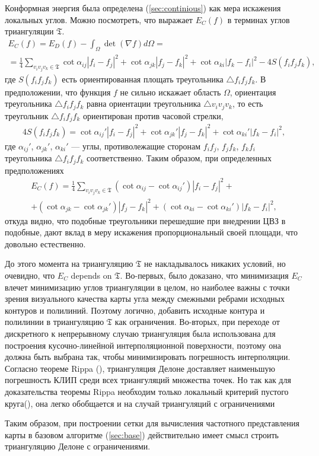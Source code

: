 Конформная энергия была определена (\ref{sec:continious}) как мера искажения локальных углов.
Можно посмотреть, что выражает $E_C(f)$ в терминах углов триангуляции $\mathfrak{T}$. 
\begin{multline*}
  E_C(f) = E_D(f) - \int_{\Omega} \det (\nabla f) d\Omega = \\ 
  = \frac{1}{4} \sum_{v_i v_j v_k \in \mathfrak{T}} \cot{\alpha_{ij}}|f_i - f_j|^2 + 
  \cot{\alpha_{jk}}|f_j - f_k|^2 + \cot{\alpha_{ki}}|f_k - f_i|^2 - 4S(f_i f_j f_k),
\end{multline*}
где $S(f_i f_j f_k)$ есть ориентированная площать треугольника $\triangle f_i f_j f_k$. 
В предположении, что функция $f$ не сильно искажает область $\Omega$, 
ориентация треугольника $\triangle f_i f_j f_k$ равна ориентации треугольника 
$\triangle v_i v_j v_k$, то есть треугольник $\triangle f_i f_j f_k$ ориентирован против часовой
стрелки,
\begin{multline*}
  4 S(f_i f_j f_k) = \cot{\alpha_{ij}'}|f_i - f_j|^2 + \cot{\alpha_{jk}'}|f_j - f_k|^2 + \cot{\alpha_{ki}'}|f_k - f_i|^2,
\end{multline*}
где $\alpha_{ij}'$, $\alpha_{jk}'$, $\alpha_{ki}'$ --- углы, противолежащие сторонам $f_i f_j$, 
$f_j f_k$, $f_k f_i$ треугольника $\triangle f_i f_j f_k$ соответственно. 
Таким образом, при определенных предположениях
\begin{multline*}
  E_C(f) = \frac{1}{4} \sum_{v_i v_j v_k \in \mathfrak{T}} (\cot{\alpha_{ij}} - \cot{\alpha_{ij}'})|f_i - f_j|^2 + \\
  + (\cot{\alpha_{jk}} - \cot{\alpha_{jk}'})|f_j - f_k|^2 + (\cot{\alpha_{ki}} - \cot{\alpha_{ki}'})|f_k - f_i|^2,
\end{multline*} откуда видно, что подобные треугольники перешедшие при внедрении ЦВЗ в подобные,
дают вклад в меру искажения пропорциональный своей площади, что довольно естественно.

До этого момента на триангуляцию $\mathfrak{T}$ не накладывалось никаких условий, но очевидно, что
$E_C$ depends on $\mathfrak{T}$. Во-первых, было доказано, что минимизация $E_C$ влечет 
минимизацию углов триангуляции в целом, но наиболее важны с точки зрения визуального качества
карты угла между смежными ребрами исходных контуров и полилиний. Поэтому логично, 
добавить исходные контура и полилинии в триангуляцию $\mathfrak{T}$ как ограничения.
Во-вторых, при переходе от дискретного к непрерывному случаю триангуляция была использована для
построения кусочно-линейной интерполяционной поверхности, поэтому она должна быть выбрана так,
чтобы минимизировать погрешность интерполяции. Согласно теореме Rippa (\cite{Rippa}), 
триангуляция Делоне доставляет наименьшую погрешность КЛИП среди всех триангуляций 
множества точек.
Но так как для доказательства теоремы Rippa необходим только локальный критерий 
пустого круга(\cite{Chen}), она легко обобщается и на случай триангуляций с ограничениями

Таким образом, при построении сетки для вычисления частотного представления карты в 
базовом алгоритме (\ref{sec:base}) действительно имеет смысл строить триангуляцию Делоне 
с ограничениями. 
